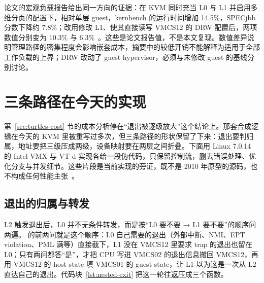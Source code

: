 论文的宏观负载报告给出同一方向的证据：在 KVM 同时充当 L0 与 L1 并启用多维分页的配置下，相对单层 guest，kernbench 的运行时间增加 14.5\%，SPECjbb 分数下降约 7.8\%；改用修改 L1、使其直接读写 VMCS12 的 DRW 配置后，两项数值分别变为 10.3\% 与 6.3\%~\cite[\S4.1, Table 2]{source7}。这些是论文报告值，不是本文复现。数值差异说明管理路径的密集程度会影响嵌套成本，摘要中的较低开销不能解释为适用于全部工作负载的上界；DRW 改动了 guest hypervisor，必须与未修改 guest 的基线分别讨论。

\section{三条路径在今天的实现}\label{sec:nested-code}

第~\ref{sec:turtles-cost} 节的成本分析停在“退出被逐级放大”这个结论上。那套合成逻辑在今天的 KVM 里被重写过多次，但三条路径的形状保留了下来：退出要判归属，地址要把三级压成两级，设备映射要在两层之间折叠。下面用 Linux 7.0.14 的 Intel VMX 与 VT-d 实现各给一段伪代码，只保留控制流，删去错误处理、优化分支与并发细节。这些片段是当前实现的旁证，既不是 2010 年原型的源码，也不构成任何性能主张~\cite{source5}。

\subsection{退出的归属与转发}\label{sec:nested-code-exit}

L2 触发退出后，L0 并不无条件转发，而是按“L0 要不要 → L1 要不要”的顺序问两遍。 的前两问就是这个顺序：L0 自己需要的退出（外部中断、NMI、EPT violation、PML 满等）直接截下，L1 没在 VMCS12 里要求 trap 的退出也留在 L0；只有两问都答“是”，才把 CPU 写进 VMCS02 的退出信息搬回 VMCS12，再用 VMCS12 的 host state 填 VMCS01 的 guest state，让 L1 以为这是一次从 L2 直达自己的退出。代码块~\ref{lst:nested-exit} 把这一轮往返压成三个函数。

